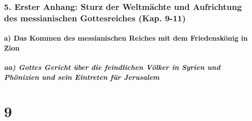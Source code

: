 \hypertarget{erster-anhang-sturz-der-weltmuxe4chte-und-aufrichtung-des-messianischen-gottesreiches-kap.-9-11}{%
\subsubsection{5. Erster Anhang: Sturz der Weltmächte und Aufrichtung
des messianischen Gottesreiches (Kap.
9-11)}\label{erster-anhang-sturz-der-weltmuxe4chte-und-aufrichtung-des-messianischen-gottesreiches-kap.-9-11}}

\hypertarget{a-das-kommen-des-messianischen-reiches-mit-dem-friedenskuxf6nig-in-zion}{%
\paragraph{a) Das Kommen des messianischen Reiches mit dem Friedenskönig
in
Zion}\label{a-das-kommen-des-messianischen-reiches-mit-dem-friedenskuxf6nig-in-zion}}

\hypertarget{aa-gottes-gericht-uxfcber-die-feindlichen-vuxf6lker-in-syrien-und-phuxf6nizien-und-sein-eintreten-fuxfcr-jerusalem}{%
\subparagraph{aa) Gottes Gericht über die feindlichen Völker in Syrien
und Phönizien und sein Eintreten für
Jerusalem}\label{aa-gottes-gericht-uxfcber-die-feindlichen-vuxf6lker-in-syrien-und-phuxf6nizien-und-sein-eintreten-fuxfcr-jerusalem}}

\hypertarget{section-8}{%
\section{9}\label{section-8}}

